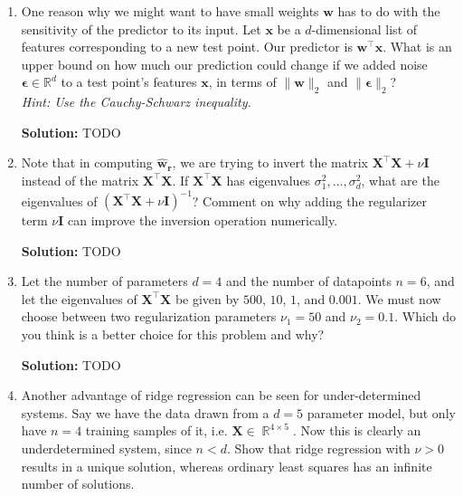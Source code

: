 \documentclass{article}
\newcommand{\mat}[1]{\mathbf{#1}}
\renewcommand{\vec}[1]{\boldsymbol{\mathbf{#1}}}
\DeclareMathOperator{\R}{\mathbb{R}}
\newenvironment{solution}{\color{blue} \smallskip \textbf{Solution:}}{}
\begin{document}
\begin{enumerate}

    \item One reason why we might want to have small weights $\vec{w}$ has to do with the sensitivity of the predictor to its input. Let $\vec{x}$ be a $d$-dimensional list of features corresponding to a new test point. Our predictor is $\vec{w}^\top \vec{x}$.  What is an upper bound on how much our prediction could change if we added noise $\vec{\epsilon} \in \mathbb{R}^d$ to a test point's features $\vec{x}$, in terms of $\|\vec{w}\|_2$ and $\|\vec\epsilon\|_2$? \\
    \emph{Hint: Use the Cauchy-Schwarz inequality.}
    
    \begin{solution}
        TODO
    \end{solution}

    \newpage
    \item Note that in computing $\vec{\hat{w}_r}$, we are trying to invert the matrix $\mat{X}^\top \mat{X} + \nu \mat{I}$ instead of the matrix $\mat{X}^\top \mat{X}$. If $\mat{X}^\top \mat{X}$ has eigenvalues $\sigma_1^2, \ldots, \sigma_d^2$, what are the eigenvalues of $(\mat{X}^\top \mat{X} + \nu \mat{I})^{-1}$? Comment on why adding the regularizer term $\nu \mat{I}$ can improve the inversion operation numerically.
    
    \begin{solution}
        TODO
    \end{solution}

    \newpage
    \item Let the number of parameters $d = 4$ and the number of datapoints $n = 6$, and let the eigenvalues of $\mat{X}^\top \mat{X}$ be given by $500$, $10$, $1$, and $0.001$. We must now choose between two regularization parameters $\nu_1 = 50$ and $\nu_2 = 0.1$. Which do you think is a better choice for this problem and why?
    
    \begin{solution}
        TODO
    \end{solution}

    \newpage
    \item Another advantage of ridge regression can be seen for under-determined systems. Say we have the data drawn from a $d = 5$ parameter model, but only have $n = 4$ training samples of it, i.e. $\mat{X} \in \R^{4 \times 5}$. Now this is clearly an underdetermined system, since $n < d$. Show that ridge regression with $\nu > 0$ results in a unique solution, whereas ordinary least squares has an infinite number of solutions.
    

\end{enumerate}
\end{document}
